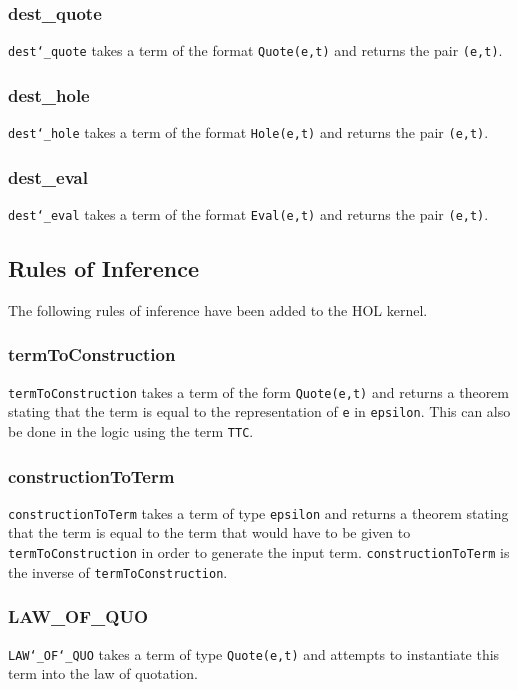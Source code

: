 \documentclass{article}
\def\c#1{\texttt{#1}}
\begin{document}
\subsubsection{dest\_quote}
\c{dest\char`\_quote} takes a term of the format \c{Quote(e,t)} and returns the pair \c{(e,t)}.

\subsubsection{dest\_hole}
\c{dest\char`\_hole} takes a term of the format \c{Hole(e,t)} and returns the pair \c{(e,t)}.

\subsubsection{dest\_eval}
\c{dest\char`\_eval} takes a term of the format \c{Eval(e,t)} and returns the pair \c{(e,t)}.

\subsection{Rules of Inference}
The following rules of inference have been added to the HOL kernel. 

\subsubsection{termToConstruction}
\c{termToConstruction} takes a term of the form \c{Quote(e,t)} and returns a theorem stating that the term is equal to the representation of \c{e} in \c{epsilon}. This can also be done in the logic using the term \c{TTC}.

\subsubsection{constructionToTerm}
\c{constructionToTerm} takes a term of type \c{epsilon} and returns a theorem stating that the term is equal to the term that would have to be given to \c{termToConstruction} in order to generate the input term. \c{constructionToTerm} is the inverse of \c{termToConstruction}.

\subsubsection{LAW\_OF\_QUO}
\c{LAW\char`\_OF\char`\_QUO} takes a term of type \c{Quote(e,t)} and attempts to instantiate this term into the law of quotation.
\end{document}
